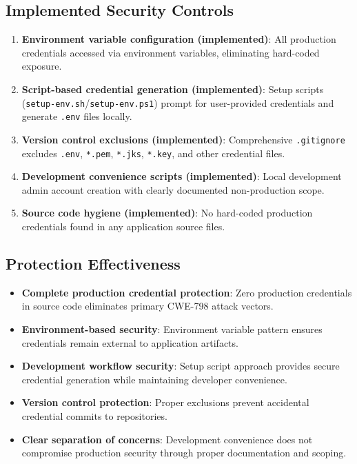 \documentclass[]{UCD_CS_FYP_Report}
\begin{document}
\subsection{Implemented Security Controls}
\begin{enumerate}
	\item \textbf{Environment variable configuration (implemented)}: All production credentials accessed via environment variables, eliminating hard-coded exposure.
	\item \textbf{Script-based credential generation (implemented)}: Setup scripts (\texttt{setup-env.sh}/\texttt{setup-env.ps1}) prompt for user-provided credentials and generate \texttt{.env} files locally.
	\item \textbf{Version control exclusions (implemented)}: Comprehensive \texttt{.gitignore} excludes \texttt{.env}, \texttt{*.pem}, \texttt{*.jks}, \texttt{*.key}, and other credential files.
	\item \textbf{Development convenience scripts (implemented)}: Local development admin account creation with clearly documented non-production scope.
	\item \textbf{Source code hygiene (implemented)}: No hard-coded production credentials found in any application source files.
\end{enumerate}

\subsection{Protection Effectiveness}
\begin{itemize}
	\item \textbf{Complete production credential protection}: Zero production credentials in source code eliminates primary CWE-798 attack vectors.
	\item \textbf{Environment-based security}: Environment variable pattern ensures credentials remain external to application artifacts.
	\item \textbf{Development workflow security}: Setup script approach provides secure credential generation while maintaining developer convenience.
	\item \textbf{Version control protection}: Proper exclusions prevent accidental credential commits to repositories.
	\item \textbf{Clear separation of concerns}: Development convenience does not compromise production security through proper documentation and scoping.
\end{itemize}
\end{document}
